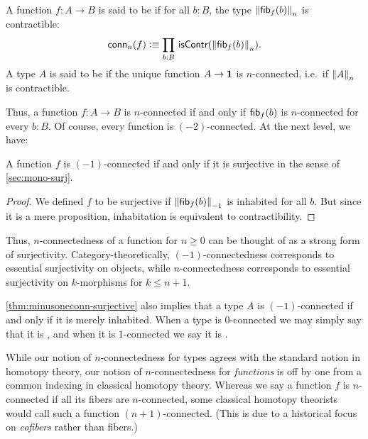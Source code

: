 \begin{defn}
A function $f:A\to B$ is said to be 
%
%
if for all $b:B$, the type $\trunc n{\hfiber f b}$ is contractible:
\begin{equation*}
  \mathsf{conn}_n(f)\defeq \prd{b:B}\iscontr(\trunc n{\hfiber{f}b}).
\end{equation*}
A type $A$ is said to be 
%
%
 if the unique function $A\to\unit$ is $n$-connected, i.e.\ if $\trunc nA$ is contractible.
\end{defn}

Thus, a function $f:A\to B$ is $n$-connected if and only if $\hfib{f}b$ is $n$-connected for every $b:B$.
Of course, every function is $(-2)$-connected.
At the next level, we have:

\begin{lem}\label{thm:minusoneconn-surjective}
  A function $f$ is $(-1)$-connected if and only if it is surjective in the sense of \cref{sec:mono-surj}.
\end{lem}
\begin{proof}
  We defined $f$ to be surjective if $\trunc{-1}{\hfiber f b}$ is inhabited for all $b$.
  But since it is a mere proposition, inhabitation is equivalent to contractibility.
\end{proof}

Thus, $n$-connectedness of a function for $n\ge 0$ can be thought of as a strong form of surjectivity.
Category-theoretically, $(-1)$-connectedness corresponds to essential surjectivity on objects, while $n$-connectedness corresponds to essential surjectivity on $k$-morphisms for $k\le n+1$.

\cref{thm:minusoneconn-surjective} also implies that a type $A$ is $(-1)$-connected if and only if it is merely inhabited.
When a type is $0$-connected we may simply say that it is ,
%
%
and when it is $1$-connected we say it is .
%
%

\begin{rmk}\label{rmk:connectedness-indexing}
  While our notion of $n$-connectedness for types agrees with the standard notion in homotopy theory, our notion of $n$-connectedness for \emph{functions} is off by one from a common indexing in classical homotopy theory.
  Whereas we say a function $f$ is $n$-connected if all its fibers are $n$-connected, some classical homotopy theorists would call such a function $(n+1)$-connected.
  (This is due to a historical focus on \emph{cofibers} rather than fibers.)
\end{rmk}

